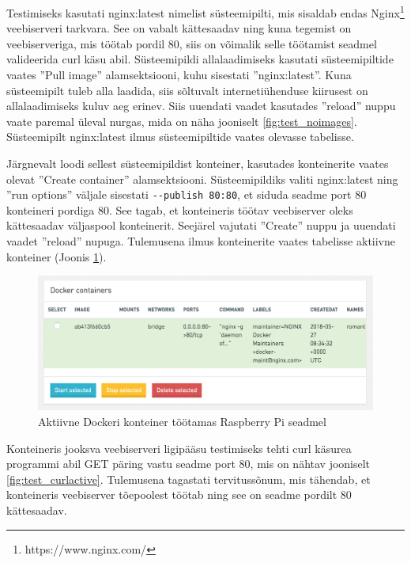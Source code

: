 \documentclass[12pt]{article}
\begin{document}
  \FloatBarrier
 
 
  Testimiseks kasutati nginx:latest nimelist süsteemipilti, mis sisaldab endas Nginx\footnote{https://www.nginx.com/}
  veebiserveri tarkvara. See on vabalt kättesaadav ning kuna tegemist on veebiserveriga, mis töötab pordil 80,
  siis on võimalik
  selle töötamist seadmel valideerida curl käsu abil. Süsteemipildi allalaadimiseks kasutati süsteemipiltide
  vaates ''Pull image'' alamsektsiooni, kuhu sisestati ''nginx:latest''. Kuna süsteemipilt tuleb alla
  laadida, siis sõltuvalt internetiühenduse kiirusest on allalaadimiseks kuluv aeg erinev. Siis uuendati
  vaadet kasutades ''reload'' nuppu vaate paremal üleval nurgas, mida on näha jooniselt \ref{fig:test_noimages}.
  Süsteemipilt nginx:latest ilmus süsteemipiltide vaates olevasse tabelisse.
 
  Järgnevalt loodi sellest süsteemipildist konteiner, kasutades konteinerite vaates olevat ''Create container''
  alamsektsiooni. Süsteemipildiks valiti nginx:latest ning ''run options'' väljale sisestati
  \verb|--publish 80:80|, et siduda seadme port 80 konteineri pordiga 80. See tagab, et
  konteineris töötav veebiserver oleks kättesaadav väljaspool konteinerit.
  Seejärel vajutati ''Create'' nuppu ja uuendati vaadet
  ''reload'' nupuga. Tulemusena ilmus konteinerite vaates tabelisse aktiivne konteiner
  (Joonis \ref{fig:test_activecontainer}).
 
  \begin{figure} [ht] %
  \begin{center}
  \includegraphics[width=1.0\textwidth]{test_activecontainer}
  \caption{Aktiivne Dockeri konteiner töötamas Raspberry Pi seadmel}
  \label{fig:test_activecontainer}
  \end{center}
  \end{figure}
 
  \FloatBarrier
 
  
  Konteineris jooksva veebiserveri ligipääsu testimiseks tehti curl käsurea programmi abil
  GET päring vastu seadme port 80, mis on nähtav jooniselt \ref{fig:test_curlactive}. Tulemusena
  tagastati tervitussõnum, mis tähendab, et konteineris veebiserver tõepoolest töötab ning
  see on seadme pordilt 80 kättesaadav.
 
\end{document}
